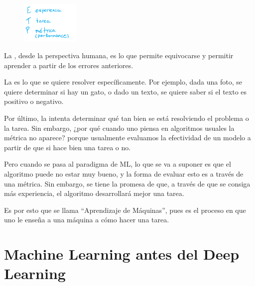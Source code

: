 \begin{figure}
  \begin{center}
    \includegraphics[width=0.25\textwidth]{img/img002.png}
  \end{center}
\end{figure}

La , desde la perspectiva humana, es lo que permite equivocarse y permitir aprender a partir de los errores anteriores. 

La  es lo que se quiere resolver específicamente. Por ejemplo, dada una foto, se quiere determinar si hay un gato, o dado un texto, se quiere saber si el texto es positivo o negativo.

Por último, la  intenta determinar qué tan bien se está resolviendo el problema o la tarea. Sin embargo, ¿por qué cuando uno piensa en algoritmos usuales la métrica no aparece? porque usualmente evaluamos la efectividad de un modelo a partir de que si hace bien una tarea o no.

Pero cuando se pasa al paradigma de ML, lo que se va a suponer es que el algoritmo puede no estar muy bueno, y la forma de evaluar esto es a través de una métrica. Sin embargo, se tiene la promesa de que, a través de que se consiga más experiencia, el algoritmo desarrollará mejor una tarea.

Es por esto que se llama ``Aprendizaje de Máquinas'', pues es el proceso en que uno le enseña a una máquina a cómo hacer una tarea.



\section{Machine Learning antes del Deep Learning}

